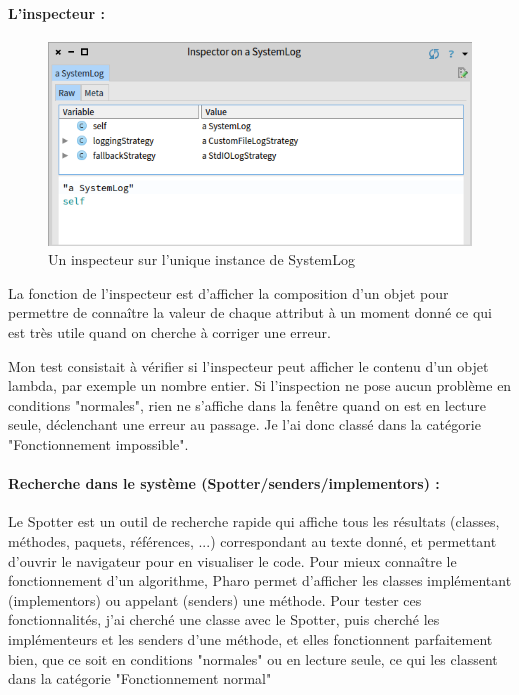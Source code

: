 \paragraph{L'inspecteur :}
\begin{figure}[h]
	\includegraphics[width=\linewidth]{./img/inspector.png}
	\caption[monticello]{Un inspecteur sur l'unique instance de SystemLog}
\end{figure}
La fonction de l'inspecteur est d'afficher la composition d'un objet pour permettre de connaître la valeur de chaque attribut à un moment donné ce qui est très utile quand on cherche à corriger une erreur.

Mon test consistait à vérifier si l'inspecteur peut afficher le contenu d'un objet lambda, par exemple un nombre entier. Si l'inspection ne pose aucun problème en conditions "normales", rien ne s'affiche dans la fenêtre quand on est en lecture seule, déclenchant une erreur au passage. Je l'ai donc classé dans la catégorie "Fonctionnement impossible".

\paragraph{Recherche dans le système (Spotter/senders/implementors) :}
	Le Spotter est un outil de recherche rapide qui affiche tous les résultats (classes, méthodes, paquets, références, ...) correspondant au texte donné, et permettant d'ouvrir le navigateur pour en visualiser le code.
	Pour mieux connaître le fonctionnement d'un algorithme, Pharo permet d'afficher les classes implémentant (implementors) ou appelant (senders) une méthode.
	Pour tester ces fonctionnalités, j'ai cherché une classe avec le Spotter, puis cherché les implémenteurs et les senders d'une méthode, et elles fonctionnent parfaitement bien, que ce soit en conditions "normales" ou en lecture seule, ce qui les classent dans la catégorie "Fonctionnement normal"

